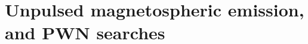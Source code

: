 \documentclass[12pt,preprint]{aastex}
\begin{document}





\section{Unpulsed magnetospheric emission, and PWN searches}









\appendix

\end{document}
